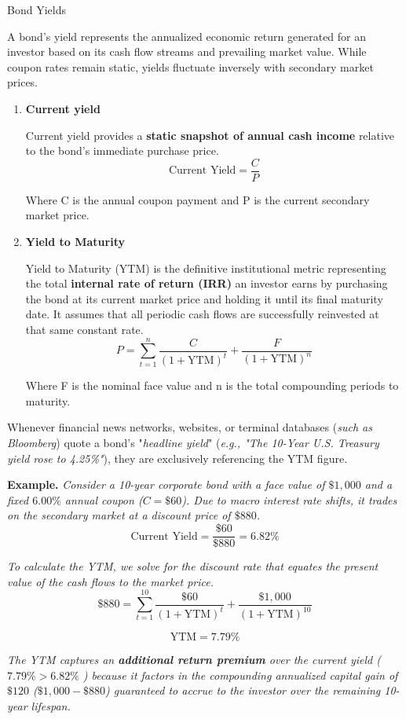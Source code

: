 \documentclass[10pt]{article}
\begin{document}
    \begin{core}[label=core:yields]{Bond Yields}

      A bond's yield represents the annualized economic return generated for an investor based on its cash flow streams and prevailing market value. While coupon rates remain static, yields fluctuate inversely with secondary market prices.

      \begin{enumerate}

        \item \textbf{Current yield} 

        Current yield provides a \textbf{static snapshot of annual cash income} relative to the bond's immediate purchase price.
        \[
          \text{Current Yield} = \frac{C}{P}
        \]

        Where C is the annual coupon payment and P is the current secondary market price.

        \item \textbf{Yield to Maturity}

        Yield to Maturity (YTM) is the definitive institutional metric representing the total \textbf{internal rate of return (IRR)} an investor earns by purchasing the bond at its current market price and holding it until its final maturity date. It assumes that all periodic cash flows are successfully reinvested at that same constant rate.
        \[
          P = \sum_{t=1}^{n} \frac{C}{(1 + \text{YTM})^t} + \frac{F}{(1 + \text{YTM})^n}
        \]

        Where F is the nominal face value and n is the total compounding periods to maturity. 

      \end{enumerate}
      
      Whenever financial news networks, websites, or terminal databases (\textit{such as Bloomberg}) quote a bond's "\textit{headline yield}" (\textit{e.g., "The 10-Year U.S. Treasury yield rose to 4.25\%"}), they are exclusively referencing the YTM figure. 

      \textbf{Example.} \textit{Consider a 10-year corporate bond with a face value of $\$1,000$ and a fixed $6.00\%$ annual coupon ($C = \$60$). Due to macro interest rate shifts, it trades on the secondary market at a discount price of $\$880$.}
      \[
        \text{Current Yield} = \frac{\$60}{\$880} = 6.82\%
      \]
      
      \textit{To calculate the YTM, we solve for the discount rate that equates the present value of the cash flows to the market price.}
      \[
        \$880 = \sum_{t=1}^{10} \frac{\$60}{(1 + \text{YTM})^t} + \frac{\$1,000}{(1 + \text{YTM})^{10}}
      \]

      \[
        \text{YTM} = 7.79\%
      \]
      
      \textit{The YTM captures an \textbf{additional return premium} over the current yield ( $7.79\% > 6.82\%$ ) because it factors in the compounding annualized capital gain of $\$120$ ($\$1,000 - \$880$) guaranteed to accrue to the investor over the remaining 10-year lifespan.}

    \end{core}
\end{document}

